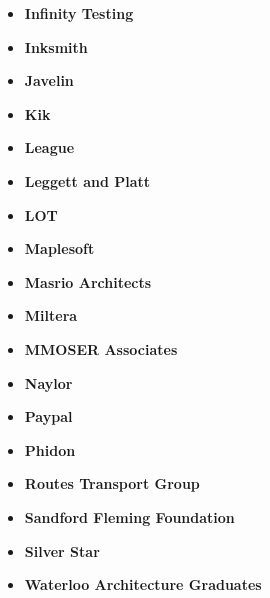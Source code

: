 \documentclass[main.tex]{subfiles}
\begin{document}
\begin{flushleft}
\begin{multicols}{3}
\begin{itemize}[label={},noitemsep]
    \item \textbf{Infinity Testing}
    \item \textbf{Inksmith}
    \item \textbf{Javelin}
    \end{itemize}
\end{multicols}

\begin{multicols}{3}
\begin{itemize}[label={},noitemsep]
    \item \textbf{Kik}
    \item \textbf{League}
    \item \textbf{Leggett and Platt}
    \end{itemize}
\end{multicols}

\begin{multicols}{3}
\begin{itemize}[label={},noitemsep]
    \item \textbf{LOT}
    \item \textbf{Maplesoft}
    \item \textbf{Masrio Architects}
    \end{itemize}
\end{multicols}

\begin{multicols}{3}
\begin{itemize}[label={},noitemsep]
    \item \textbf{Miltera}
    \item \textbf{MMOSER Associates}
    \item \textbf{Naylor}
    \end{itemize}
\end{multicols}

\begin{multicols}{3}
\begin{itemize}[label={},noitemsep]
    \item \textbf{Paypal}
    \item \textbf{Phidon}
    \item \textbf{Routes Transport Group}
    \end{itemize}
\end{multicols}

\begin{multicols}{3}
\begin{itemize}[label={},noitemsep]
    \item \textbf{Sandford Fleming Foundation}
    \item \textbf{Silver Star}
    \item \textbf{Waterloo Architecture Graduates}
    \end{itemize}
\end{multicols}


\end{flushleft}
\end{document}

